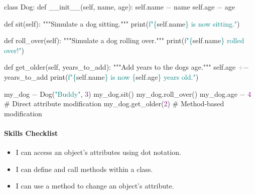 \documentclass[
  justified,
  openright,
]{tufte-book}
\let\subsubsection\paragraph
\let\paragraph\paragraph
\newcommand{\BuiltInTok}[1]{#1}
\newcommand{\CommentTok}[1]{\textcolor{MidGray}{#1}}
\newcommand{\DecValTok}[1]{\textcolor{Purple}{#1}}
\newcommand{\FunctionTok}[1]{\textcolor{BrandBlue}{#1}}
\newcommand{\KeywordTok}[1]{\textcolor{BrandBlue}{#1}}
\newcommand{\NormalTok}[1]{#1}
\newcommand{\OperatorTok}[1]{\textcolor{DarkGray}{#1}}
\newcommand{\SpecialCharTok}[1]{\textcolor{Teal}{#1}}
\newcommand{\SpecialStringTok}[1]{\textcolor{Teal}{#1}}
\newcommand{\StringTok}[1]{\textcolor{Teal}{#1}}
\newcommand{\VariableTok}[1]{#1}
\newenvironment{Shaded}{%
  \begin{snugshade}
}{%
  \end{snugshade}
}
\let\subsubsection\paragraph
\let\paragraph\paragraph
\providecommand{\tightlist}{%
  \setlength{\itemsep}{0pt}\setlength{\parskip}{0pt}}
\begin{document}
\begin{Shaded}
\begin{Highlighting}[]
\KeywordTok{class}\NormalTok{ Dog:}
    \KeywordTok{def} \FunctionTok{\_\_init\_\_}\NormalTok{(}\VariableTok{self}\NormalTok{, name, age):}
        \VariableTok{self}\NormalTok{.name }\OperatorTok{=}\NormalTok{ name}
        \VariableTok{self}\NormalTok{.age }\OperatorTok{=}\NormalTok{ age}

    \KeywordTok{def}\NormalTok{ sit(}\VariableTok{self}\NormalTok{):}
        \CommentTok{"""Simulate a dog sitting."""}
        \BuiltInTok{print}\NormalTok{(}\SpecialStringTok{f"}\SpecialCharTok{\{}\VariableTok{self}\SpecialCharTok{.}\NormalTok{name}\SpecialCharTok{\}}\SpecialStringTok{ is now sitting."}\NormalTok{)}

    \KeywordTok{def}\NormalTok{ roll\_over(}\VariableTok{self}\NormalTok{):}
        \CommentTok{"""Simulate a dog rolling over."""}
        \BuiltInTok{print}\NormalTok{(}\SpecialStringTok{f"}\SpecialCharTok{\{}\VariableTok{self}\SpecialCharTok{.}\NormalTok{name}\SpecialCharTok{\}}\SpecialStringTok{ rolled over!"}\NormalTok{)}

    \KeywordTok{def}\NormalTok{ get\_older(}\VariableTok{self}\NormalTok{, years\_to\_add):}
        \CommentTok{"""Add years to the dog\textquotesingle{}s age."""}
        \VariableTok{self}\NormalTok{.age }\OperatorTok{+=}\NormalTok{ years\_to\_add}
        \BuiltInTok{print}\NormalTok{(}\SpecialStringTok{f"}\SpecialCharTok{\{}\VariableTok{self}\SpecialCharTok{.}\NormalTok{name}\SpecialCharTok{\}}\SpecialStringTok{ is now }\SpecialCharTok{\{}\VariableTok{self}\SpecialCharTok{.}\NormalTok{age}\SpecialCharTok{\}}\SpecialStringTok{ years old."}\NormalTok{)}

\NormalTok{my\_dog }\OperatorTok{=}\NormalTok{ Dog(}\StringTok{"Buddy"}\NormalTok{, }\DecValTok{3}\NormalTok{)}
\NormalTok{my\_dog.sit()}
\NormalTok{my\_dog.roll\_over()}
\NormalTok{my\_dog.age }\OperatorTok{=} \DecValTok{4}          \CommentTok{\# Direct attribute modification}
\NormalTok{my\_dog.get\_older(}\DecValTok{2}\NormalTok{)     }\CommentTok{\# Method{-}based modification}
\end{Highlighting}
\end{Shaded}

\subsubsection{Skills Checklist}\label{skills-checklist-34}

\begin{itemize}
\tightlist
\item[$\square$]
  I can access an object's attributes using dot notation.
\item[$\square$]
  I can define and call methods within a class.
\item[$\square$]
  I can use a method to change an object's attribute.
\end{itemize}
\end{document}
